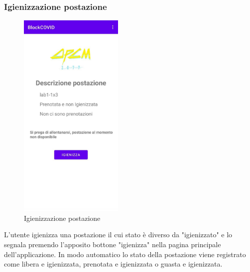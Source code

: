 \subsubsection{Igienizzazione postazione}
\begin{figure}[H]
	\centering
	\includegraphics[width=5cm]{res/images/DescrizionePostazione3.png}
	\caption{Igienizzazione postazione}
\end{figure}
L'utente igienizza una postazione il cui stato è diverso da "igienizzato" e lo segnala premendo l'apposito bottone "igienizza" nella pagina principale dell'applicazione. In modo automatico lo stato della postazione viene registrato come libera e igienizzata, prenotata e igienizzata o guasta e igienizzata.
